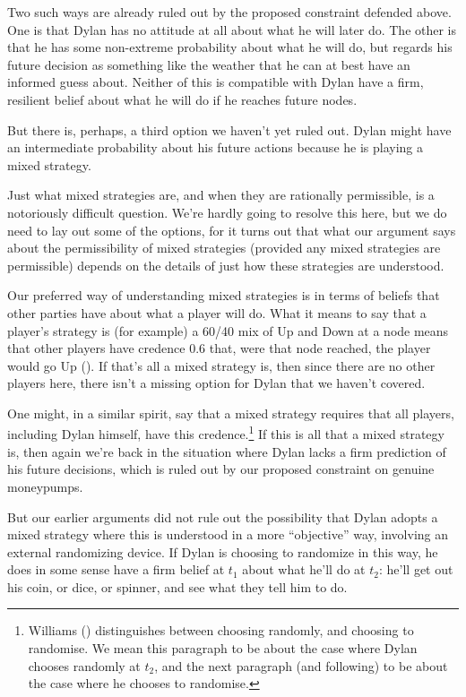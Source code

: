 \documentclass[
  11pt,
  letterpaper,
  DIV=11,
  numbers=noendperiod,
  twoside]{scrartcl}
\begin{document}
Two such ways are already ruled out by the proposed constraint defended
above. One is that Dylan has no attitude at all about what he will later
do. The other is that he has some non-extreme probability about what he
will do, but regards his future decision as something like the weather
that he can at best have an informed guess about. Neither of this is
compatible with Dylan have a firm, resilient belief about what he will
do if he reaches future nodes.

But there is, perhaps, a third option we haven't yet ruled out. Dylan
might have an intermediate probability about his future actions because
he is playing a mixed strategy.

Just what mixed strategies are, and when they are rationally
permissible, is a notoriously difficult question. We're hardly going to
resolve this here, but we do need to lay out some of the options, for it
turns out that what our argument says about the permissibility of mixed
strategies (provided any mixed strategies are permissible) depends on
the details of just how these strategies are understood.

Our preferred way of understanding mixed strategies is in terms of
beliefs that other parties have about what a player will do. What it
means to say that a player's strategy is (for example) a 60/40 mix of Up
and Down at a node means that other players have credence 0.6 that, were
that node reached, the player would go Up
(). If that's all a mixed strategy
is, then since there are no other players here, there isn't a missing
option for Dylan that we haven't covered.

One might, in a similar spirit, say that a mixed strategy requires that
all players, including Dylan himself, have this credence.\footnote{Williams
  () distinguishes between choosing
  randomly, and choosing to randomise. We mean this paragraph to be
  about the case where Dylan chooses randomly at \(t_2\), and the next
  paragraph (and following) to be about the case where he chooses to
  randomise.} If this is all that a mixed strategy is, then again we're
back in the situation where Dylan lacks a firm prediction of his future
decisions, which is ruled out by our proposed constraint on genuine
moneypumps.

But our earlier arguments did not rule out the possibility that Dylan
adopts a mixed strategy where this is understood in a more ``objective''
way, involving an external randomizing device. If Dylan is choosing to
randomize in this way, he does in some sense have a firm belief at
\(t_1\) about what he'll do at \(t_2\): he'll get out his coin, or dice,
or spinner, and see what they tell him to do.
\end{document}

